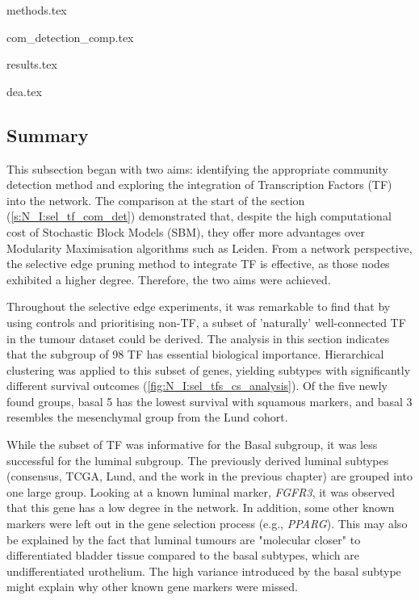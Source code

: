 {methods.tex}

{com_detection_comp.tex}

{results.tex}

{dea.tex}


\subsection{Summary}

This subsection began with two aims: identifying the appropriate community detection method and exploring the integration of Transcription Factors (TF) into the network. The comparison at the start of the section (\ref{s:N_I:sel_tf_com_det}) demonstrated that, despite the high computational cost of Stochastic Block Models (SBM), they offer more advantages over Modularity Maximisation algorithms such as Leiden. From a network perspective, the selective edge pruning method to integrate TF is effective, as those nodes exhibited a higher degree. Therefore, the two aims were achieved.

Throughout the selective edge experiments, it was remarkable to find that by using controls and prioritising non-TF, a subset of 'naturally' well-connected TF in the tumour dataset could be derived. The analysis in this section indicates that the subgroup of 98 TF has essential biological importance. Hierarchical clustering was applied to this subset of genes, yielding subtypes with significantly different survival outcomes (\cref{fig:N_I:sel_tfs_cs_analysis}). Of the five newly found groups, basal 5 has the lowest survival with squamous markers, and basal 3 resembles the mesenchymal group from the Lund cohort.

While the subset of TF was informative for the Basal subgroup, it was less successful for the luminal subgroup. The previously derived luminal subtypes (consensus, TCGA, Lund, and the work in the previous chapter) are grouped into one large group. Looking at a known luminal marker, \textit{FGFR3}, it was observed that this gene has a low degree in the network. In addition, some other known markers were left out in the gene selection process (e.g., \textit{PPARG}). This may also be explained by the fact that luminal tumours are "molecular closer" to differentiated bladder tissue compared to the basal subtypes, which are undifferentiated urothelium. The high variance introduced by the basal subtype might explain why other known gene markers were missed.

